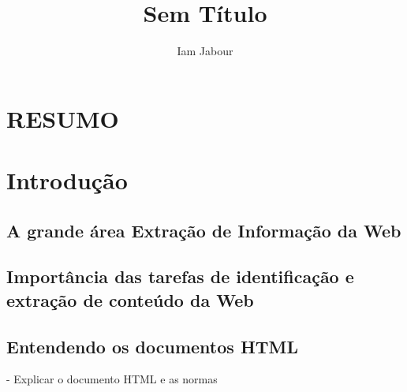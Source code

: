 \documentclass{acm_proc_article-sp}
\numberwithin{equation}{section}
\begin{document}
\title{Sem Título}

\author{
\alignauthor
Iam Jabour  
\and \alignauthor {}
}


\maketitle

\begin{abstract}


\end{abstract}

\section*{RESUMO}\normalsize %









\section{Introdução}

\subsection{A grande área Extração de Informação da Web}

\subsection{Importância das tarefas de identificação e extração de conteúdo da Web}

\subsection{Entendendo os documentos HTML}

- Explicar o documento HTML e as normas
\end{document}
